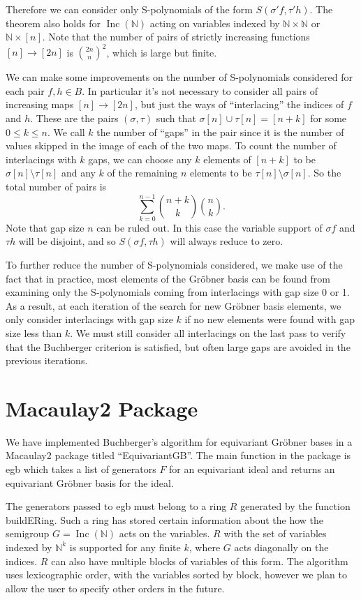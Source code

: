 \documentclass{amsart}
\theoremstyle{definition}
\theoremstyle{remark}
\numberwithin{equation}{section}
\newcommand{\B}[1]{\mathbb #1}
\newcommand{\<}{\langle}
\renewcommand{\>}{\rangle}
\newcommand{\Inc}{\operatorname{Inc}(\B N)}
\begin{document}
Therefore we can consider only S-polynomials of the form $S(\sigma' f,\tau' h)$.  The theorem also holds for $\Inc$ acting on variables indexed by $\B N \times \B N$ or $\B N \times [n]$.  Note that the number of pairs of strictly increasing functions $[n] \to [2n]$ is $\binom{2n}{n}^2$, which is large but finite.

We can make some improvements on the number of S-polynomials considered for each pair $f,h \in B$.  In particular it's not necessary to consider all pairs of increasing maps $[n] \to [2n]$, but just the ways of ``interlacing'' the indices of $f$ and $h$.  These are the pairs $(\sigma,\tau)$ such that $\sigma[n] \cup \tau[n] = [n+k]$ for some $0 \leq k \leq n$.  We call $k$ the number of ``gaps'' in the pair since it is the number of values skipped in the image of each of the two maps.  To count the number of interlacings with $k$ gaps, we can choose any $k$ elements of $[n+k]$ to be $\sigma[n] \setminus \tau[n]$ and any $k$ of the remaining $n$ elements to be $\tau[n] \setminus \sigma[n]$.  So the total number of pairs is
 \[ \sum_{k=0}^{n-1} \binom{n+k}{k}\binom{n}{k}. \]
Note that gap size $n$ can be ruled out.  In this case the variable support of $\sigma f$ and $\tau h$ will be disjoint, and so $S(\sigma f, \tau h)$ will always reduce to zero.

To further reduce the number of S-polynomials considered, we make use of the fact that in practice, most elements of the Gr\"obner basis can be found from examining only the S-polynomials coming from interlacings with gap size 0 or 1.  As a result, at each iteration of the search for new Gr\"obner basis elements, we only consider interlacings with gap size $k$ if no new elements were found with gap size less than $k$.  We must still consider all interlacings on the last pass to verify that the Buchberger criterion is satisfied, but often large gaps are avoided in the previous iterations.

\section{Macaulay2 Package}
We have implemented Buchberger's algorithm for equivariant Gr\"obner bases in a Macaulay2 package titled ``EquivariantGB''.  The main function in the package is {\ttfamily egb} which takes a list of generators $F$ for an equivariant ideal and returns an equivariant Gr\"obner basis for the ideal.

The generators passed to {\ttfamily egb} must belong to a ring $R$ generated by the function {\ttfamily buildERing}.  Such a ring has stored certain information about the how the semigroup $G = \Inc$ acts on the variables.  $R$ with the set of variables indexed by $\B N^k$ is supported for any finite $k$, where $G$ acts diagonally on the indices.   $R$ can also have multiple blocks of variables of this form.  The algorithm uses lexicographic order, with the variables sorted by block, however we plan to allow the user to specify other orders in the future.
\end{document}
